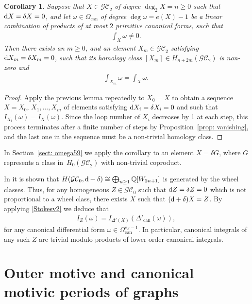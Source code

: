 \documentclass[pdftex]{sigma}%
\newtheorem{cor}[thm]{Corollary}
\numberwithin{equation}{section}
\newcommand{\Q}{\mathbb Q}
\newcommand{\GC}{\mathcal{GC}}
\newcommand{\can}{\mathrm{can}}
\newcommand{\0}{\color{blue}{\mathsf{0}}}
\begin{document}
\begin{cor} \label{cor: detectclassv2} Suppose that $X \in \GC_2$ of degree $\deg_2 X = n\geq0 $ such that ${\rm d}X = \delta X=0$, and let $\omega \in \Omega_{\can}$
of degree $\deg \omega = e(X)-1$
be a linear combination of products of at most $2$ primitive canonical forms, such that
\begin{gather*}
 \int_{X} \omega \neq 0.
 \end{gather*}
Then there exists an $m\geq 0$, and an element $X_m \in \GC_2$ satisfying ${\rm d}X_m = \delta X_m=0$, such that its homology class $[X_m] \in H_{n+2m}(\GC_2)$ is non-zero and
\begin{gather*}
\int_{X_m} \omega = \int_{X} \omega.
\end{gather*}
\end{cor}
\begin{proof}
Apply the previous lemma repeatedly to $X_0=X$ to obtain a sequence $X=X_0$, $X_1,\dots,X_m $ of elements satisfying ${\rm d} X_i = \delta X_i=0$ and such that $I_{X_i}(\omega) = I_X(\omega)$. Since the loop number of $X_i$ decreases by 1 at each step, this process terminates after a finite number of steps by Proposition~\ref{prop: vanishing}, and the last one in the sequence must be a non-trivial homology class.
\end{proof}

In Section~\ref{sect: omega59} we apply the corollary to an element $X = \delta G$, where $G$ represents a class in~$H_0(\GC_2)$ with non-trivial coproduct.

\begin{rem} In \cite{SpectralSequenceGC2} it is shown that
$H(\GC_0, {\rm d}+ \delta) \cong \bigoplus_{n\geq 1} \Q [W_{2n+1}] $ is generated by the wheel classes. Thus, for any homogeneous $Z\in \GC_0$ such that ${\rm d}Z = \delta Z =0$ which is not proportional to a wheel class, there exists $X$ such that $({\rm d}+ \delta) X=Z$. By applying \eqref{Stokesv2} we deduce that
\begin{gather*}
I_{Z}(\omega) = I_{\Delta' (X)}( \Delta'_{\can}(\omega)),
\end{gather*}
for
 any canonical differential form $\omega \in \Omega^{e_Z-1}_{\can}$. In particular, canonical integrals of any such $Z$ are trivial modulo products of lower order canonical integrals.
\end{rem}

\section{Outer motive and canonical motivic periods of graphs}
\end{document}
